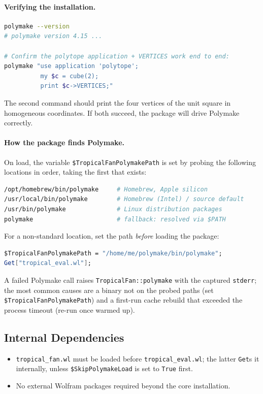\documentclass[11pt,a4paper]{article}
\begin{document}
\paragraph{Verifying the installation.}
\begin{lstlisting}[language=bash]
polymake --version
# polymake version 4.15 ...

# Confirm the polytope application + VERTICES work end to end:
polymake "use application 'polytope';
          my $c = cube(2);
          print $c->VERTICES;"
\end{lstlisting}
The second command should print the four vertices of the unit square in
homogeneous coordinates. If both succeed, the package will drive Polymake
correctly.

\paragraph{How the package finds Polymake.}\label{sec:polymake-detect}
On load, the variable \texttt{\$TropicalFanPolymakePath} is set by probing the
following locations in order, taking the first that exists:
\begin{lstlisting}[language=bash]
/opt/homebrew/bin/polymake     # Homebrew, Apple silicon
/usr/local/bin/polymake        # Homebrew (Intel) / source default
/usr/bin/polymake              # Linux distribution packages
polymake                       # fallback: resolved via $PATH
\end{lstlisting}
For a non-standard location, set the path \emph{before} loading the package:
\begin{lstlisting}[language=Mathematica]
$TropicalFanPolymakePath = "/home/me/polymake/bin/polymake";
Get["tropical_eval.wl"];
\end{lstlisting}
A failed Polymake call raises \texttt{TropicalFan::polymake} with the
captured \texttt{stderr}; the most common causes are a binary not on the
probed paths (set \texttt{\$TropicalFanPolymakePath}) and a first-run cache
rebuild that exceeded the process timeout (re-run once warmed up).

\subsection{Internal Dependencies}

\begin{itemize}
  \item \texttt{tropical\_fan.wl} must be loaded before \texttt{tropical\_eval.wl}; the latter \texttt{Get}s it internally, unless \texttt{\$SkipPolymakeLoad} is set to \texttt{True} first.
  \item No external Wolfram packages required beyond the core installation.
\end{itemize}
\end{document}
